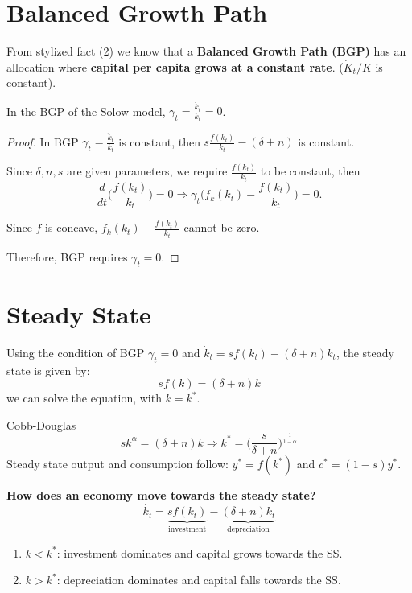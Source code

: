 \section{Balanced Growth Path}

From stylized fact (2) we know that a \textbf{Balanced Growth Path (BGP)} has  an allocation where \textbf{capital per capita grows at a constant rate}. ($\dot{K}_t/K$ is constant).

\begin{proposition}
    In the BGP of the Solow model, $\gamma_t = \frac{\dot{k}_t}{k_t} = 0$.
\end{proposition}

\begin{proof}
    In BGP $\gamma_t = \frac{\dot{k}_t}{k_t}$ is constant, then $s \frac{f(k_t)}{k_t} - (\delta + n)$ is constant.

    Since $\delta,n,s$ are given parameters, we require $\frac{f(k_t)}{k_t}$ to be constant, then \[
        \frac{d}{dt}\Big(\frac{f(k_t)}{k_t}\Big) = 0 \Longrightarrow \gamma_t \Big(f_k(k_t) - \frac{f(k_t)}{k_t}\Big) = 0.
    \]

    Since $f$ is concave, $f_k(k_t) - \frac{f(k_t)}{k_t}$ cannot be zero.

    Therefore, BGP requires $\gamma_t = 0$.
\end{proof}

\section{Steady State}

Using the condition of BGP $\gamma_t = 0$ and $\dot{k}_t = sf(k_t) - (\delta + n)k_t$, the steady state is given by: \[
    sf(k) = (\delta + n)k
\]
we can solve the equation, with $k = k^*$.

\begin{example}Cobb-Douglas
    \[
        sk^{\alpha} = (\delta + n)k \Longrightarrow k^* = \Big(\frac{s}{\delta + n}\Big)^{\frac{1}{1-\alpha}}
    \]
    Steady state output and consumption follow: $y^* = f(k^*)$ and $c^* = (1-s)y^*$.
\end{example}

\textbf{How does an economy move towards the steady state?} \[
    \dot{k_t} = \underbrace{sf(k_t)}_{\text{investment}} - \underbrace{(\delta + n)k_t}_{\text{depreciation}}
\]
\begin{enumerate}
    \item $k < k^*$: investment dominates and capital grows towards the SS.
    \item $k > k^*$: depreciation dominates and capital falls towards the SS.
\end{enumerate}

